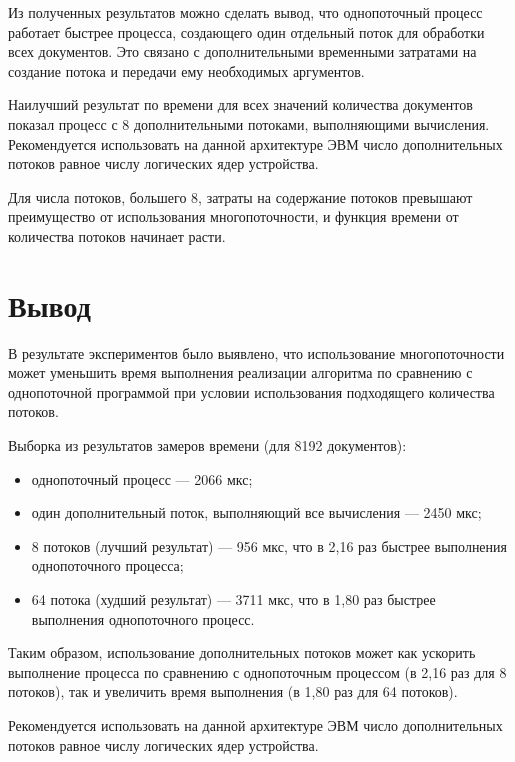 
\clearpage


Из полученных результатов можно сделать вывод, что однопоточный процесс работает быстрее процесса, создающего один отдельный поток для обработки всех документов. Это связано с дополнительными временными затратами на создание потока и передачи ему необходимых аргументов.

Наилучший результат по времени для всех значений количества документов показал процесс с 8 дополнительными потоками, выполняющими вычисления. Рекомендуется использовать на данной архитектуре ЭВМ число дополнительных потоков равное числу логических ядер устройства.

Для числа потоков, большего 8, затраты на содержание потоков превышают преимущество от использования многопоточности, и функция времени от количества потоков начинает расти.

\section*{Вывод}

В результате экспериментов было выявлено, что использование многопоточности может уменьшить время выполнения реализации алгоритма по сравнению с однопоточной программой при условии использования подходящего количества потоков.

Выборка из результатов замеров времени (для 8192 документов):
\begin{itemize}
	\item однопоточный процесс --- 2066 мкс;
	\item один дополнительный поток, выполняющий все вычисления --- 2450 мкс;
	\item 8 потоков (лучший результат) --- 956 мкс, что в 2,16 раз быстрее выполнения однопоточного процесса;
	\item 64 потока (худший результат) --- 3711 мкс, что в 1,80 раз быстрее выполнения однопоточного процесс.
\end{itemize}

Таким образом, использование дополнительных потоков может как ускорить выполнение процесса по сравнению с однопоточным процессом (в 2,16 раз для 8 потоков), так и увеличить время выполнения (в 1,80 раз для 64 потоков).

Рекомендуется использовать на данной архитектуре ЭВМ число дополнительных потоков равное числу логических ядер устройства.



